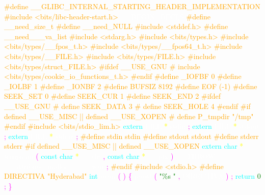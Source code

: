 \justifying \small 

\textcolor{orange}{\#define \_\_GLIBC\_INTERNAL\_STARTING\_HEADER\_IMPLEMENTATION} 
\textcolor{orange}{\#include <bits/libc-header-start.h>} 
\textcolor{white}{\_\_BEGIN\_DECLS} 
\textcolor{orange}{\#define \_\_need\_size\_t} 
\textcolor{orange}{\#define \_\_need\_NULL} 
\textcolor{orange}{\#include <stddef.h>} 
\textcolor{orange}{\#define \_\_need\_\_\_va\_list} 
\textcolor{orange}{\#include <stdarg.h>} 
\textcolor{orange}{\#include <bits/types.h>} 
\textcolor{orange}{\#include <bits/types/\_\_fpos\_t.h>} 
\textcolor{orange}{\#include <bits/types/\_\_fpos64\_t.h>} 
\textcolor{orange}{\#include <bits/types/\_\_FILE.h>} 
\textcolor{orange}{\#include <bits/types/FILE.h>} 
\textcolor{orange}{\#include <bits/types/struct\_FILE.h>} 
\textcolor{orange}{\#ifdef \_\_USE\_GNU} 
\textcolor{orange}{\# include <bits/types/cookie\_io\_functions\_t.h>} 
\textcolor{orange}{\#endif} 
\textcolor{orange}{\#define \_IOFBF 0		} 
\textcolor{orange}{\#define \_IOLBF 1		} 
\textcolor{orange}{\#define \_IONBF 2		} 
\textcolor{orange}{\#define BUFSIZ 8192} 
\textcolor{orange}{\#define EOF (-1)} 
\textcolor{orange}{\#define SEEK\_SET	0	} 
\textcolor{orange}{\#define SEEK\_CUR	1	} 
\textcolor{orange}{\#define SEEK\_END	2	} 
\textcolor{orange}{\#ifdef \_\_USE\_GNU} 
\textcolor{orange}{\# define SEEK\_DATA	3	} 
\textcolor{orange}{\# define SEEK\_HOLE	4	} 
\textcolor{orange}{\#endif} 
\textcolor{orange}{\#if defined \_\_USE\_MISC || defined \_\_USE\_XOPEN} 
\textcolor{orange}{\# define P\_tmpdir	"/tmp"} 
\textcolor{orange}{\#endif} 
\textcolor{orange}{\#include <bits/stdio\_lim.h>} 
\textcolor{cyan}{extern} 
\textcolor{white}{FILE} 
\textcolor{yellow}{*} 
\textcolor{white}{stdin} 
\textcolor{magenta}{;} 
\textcolor{cyan}{extern} 
\textcolor{white}{FILE} 
\textcolor{yellow}{*} 
\textcolor{white}{stdout} 
\textcolor{magenta}{;} 
\textcolor{cyan}{extern} 
\textcolor{white}{FILE} 
\textcolor{yellow}{*} 
\textcolor{white}{stderr} 
\textcolor{magenta}{;} 
\textcolor{orange}{\#define stdin stdin} 
\textcolor{orange}{\#define stdout stdout} 
\textcolor{orange}{\#define stderr stderr} 
\textcolor{orange}{\#if defined \_\_USE\_MISC || defined \_\_USE\_XOPEN} 
\textcolor{cyan}{extern} 
\textcolor{cyan}{char} 
\textcolor{yellow}{*} 
\textcolor{white}{tempnam} 
\textcolor{magenta}{(} 
\textcolor{cyan}{const} 
\textcolor{cyan}{char} 
\textcolor{yellow}{*} 
\textcolor{white}{\_\_dir} 
\textcolor{magenta}{,} 
\textcolor{cyan}{const} 
\textcolor{cyan}{char} 
\textcolor{yellow}{*} 
\textcolor{white}{\_\_pfx} 
\textcolor{magenta}{)} 
\textcolor{white}{\_\_THROW} 
\textcolor{white}{\_\_attribute\_malloc\_\_} 
\textcolor{white}{\_\_wur} 
\textcolor{magenta}{;} 
\textcolor{orange}{\#endif} 
\textcolor{orange}{\#include <stdio.h>} 
\textcolor{orange}{\#define DIRECTIVA "Hyderabad" } 
\textcolor{cyan}{int} 
\textcolor{white}{main} 
\textcolor{magenta}{(} 
\textcolor{magenta}{)} 
\textcolor{magenta}{\{} 
\textcolor{white}{printf} 
\textcolor{magenta}{(} 
\textcolor{green}{"\%s "} 
\textcolor{magenta}{,} 
\textcolor{white}{DIRECTIVA} 
\textcolor{magenta}{)} 
\textcolor{magenta}{;} 
\textcolor{cyan}{return} 
\textcolor{green}{0} 
\textcolor{magenta}{;} 
\textcolor{magenta}{\}} 




